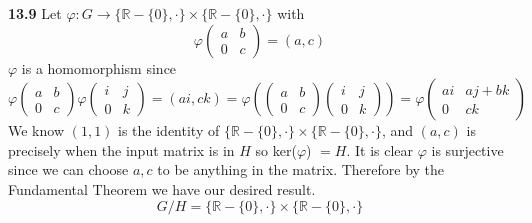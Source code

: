 \documentclass[12pt]{article}
\newenvironment{ques}{\vspace{2 ex}}{\vspace{2 ex}}
\theoremstyle{definition}
\begin{document}
\begin{ques} 
	\textbf{13.9} 
		Let $\varphi : G \to \{\mathbb{R} - \{0\},\cdot \} \times
		\{\mathbb{R} - \{0\},\cdot \}$ with 
		$$\varphi \left(\begin{matrix} a & b\\ 0 & c \end{matrix}\right) = (a,c)$$
		$\varphi$ is a homomorphism since 
		$$\varphi \left(\begin{matrix} a & b\\ 0 & c
		\end{matrix}\right)\varphi \left(\begin{matrix} i & j\\
		0 & k \end{matrix}\right) = (ai, ck) =\varphi\left(
		\left(\begin{matrix} a & b\\ 0 & c \end{matrix}\right)
		\left(\begin{matrix} i & j\\ 0 & k
		\end{matrix}\right)\right) = \varphi\left(\begin{matrix} ai & aj + bk\\
		0 & ck \end{matrix}\right)$$
		We know $(1,1)$ is the identity of $\{\mathbb{R} - \{0\},\cdot \} \times
		\{\mathbb{R} - \{0\},\cdot \}$, and $(a,c)$ is precisely when
		the input matrix is in $H$ so ker($\varphi$) $= H$. It is clear
		$\varphi$ is surjective since we can choose $a, c$ to be
		anything in the matrix. Therefore
		by the Fundamental Theorem we have our desired result.
		$$G/H = \{\mathbb{R} - \{0\},\cdot \} \times \{\mathbb{R} -
		\{0\},\cdot \}$$
		
\end{ques}
\end{document}
